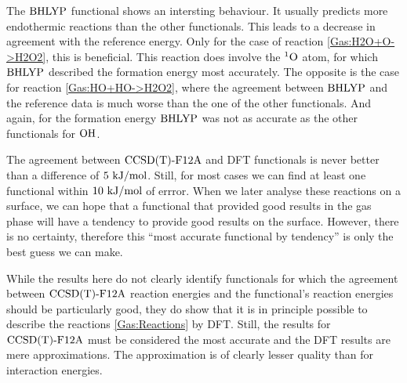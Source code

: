 \documentclass[8.5pt,twoside,twocolumn]{article}
\newcommand\singo{\enmat{{^1\te{O}}}}
\newcommand\tripot{\enmat{{^3\ot}}}
\newcommand\kmo{\enmat{\te {kJ/mol}}}
\theoremstyle{standard}
\begin{document}
The $\text{BHLYP}$ functional shows an intersting behaviour. It usually
predicts more endothermic reactions than the other functionals.
This leads to a decrease in agreement with the reference energy.
Only for the case of reaction \eqref{Gas:H2O+O->H2O2}, this is beneficial. This
reaction does involve the $\singo$ atom, for which $\text{BHLYP}$ described the
formation energy most accurately. The opposite is the case for reaction
\eqref{Gas:HO+HO->H2O2}, where the agreement between $\text{BHLYP}$ and the reference
data is much worse than the one of the other functionals. And again, for the
formation energy $\text{BHLYP}$ was not as accurate as the other functionals for
$\text O \text H$.

The agreement between $\text{CCSD(T)-F12A}$ and DFT functionals is never better than a
difference of $5~\kmo$. Still, for most cases we can find at least one
functional within $10~\kmo$ of errror. When we later analyse these reactions on
a surface, we can hope that a functional that provided good results in the
gas phase will have a tendency to provide good results on the surface. However,
there is no certainty, therefore this ``most accurate functional by tendency'' is
only the best guess we can make. 

While the results here do not clearly identify functionals for which the
agreement between $\text{CCSD(T)-F12A}$ reaction energies and the functional's reaction
energies should be particularly good, they do show that it is in
principle possible to describe the reactions \eqref{Gas:Reactions} by DFT.
Still, the results for $\text{CCSD(T)-F12A}$ must be considered the most accurate
and the DFT results are mere approximations. The approximation is of
clearly lesser quality than for interaction energies.
\end{document}
